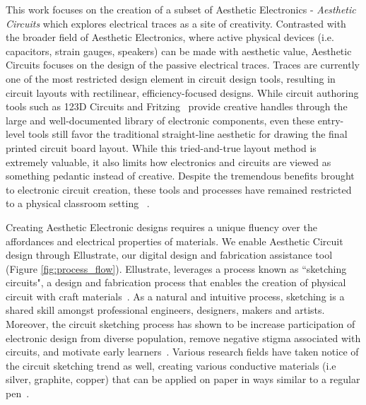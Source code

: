 \documentclass{sigchi}
\begin{document}
This work focuses on the creation of a subset of Aesthetic Electronics - \textit{Aesthetic Circuits} which explores electrical traces as a site of creativity.
Contrasted with the broader field of Aesthetic Electronics, where active physical devices (i.e. capacitors, strain gauges, speakers) can be made with aesthetic value, Aesthetic Circuits focuses on the design of the passive electrical traces. 
Traces are currently one of the most restricted design element in circuit design tools, resulting in circuit layouts with rectilinear, efficiency-focused designs.
While circuit authoring tools such as 123D Circuits and Fritzing~\cite{_autodesk123d_2016} provide creative handles through the large and well-documented library of electronic components, even these entry-level tools still favor the traditional straight-line aesthetic for drawing the final printed circuit board layout.
While this tried-and-true layout method is extremely valuable, it also limits how electronics and circuits are viewed as something pedantic instead of creative. 
Despite the tremendous benefits brought to electronic circuit creation, these tools and processes have remained restricted to a physical classroom setting ~\cite{qi_stickers_2015,qi_sketching_2014}.   
    
Creating Aesthetic Electronic designs requires a unique fluency over the affordances and electrical properties of materials.
We enable Aesthetic Circuit design through Ellustrate, our digital design and fabrication assistance tool (Figure \ref{fig:process_flow}). Ellustrate, leverages a process known as ``sketching circuits", a design and fabrication process that enables the creation of physical circuit with craft materials~\cite{qi_sketching_2014}. As a natural and intuitive process, sketching is a shared skill amongst professional engineers, designers, makers and artists. Moreover, the circuit sketching process has shown to be increase participation of electronic design from diverse population, remove negative stigma associated with circuits, and motivate early learners~\cite{qi_stickers_2015}. Various research fields have taken notice of the circuit sketching trend as well, creating various conductive materials (i.e silver, graphite, copper) that can be applied on paper in ways similar to a regular pen~\cite{russo2011pen,Anonymous:ojhPyGTN}. 
\end{document}
